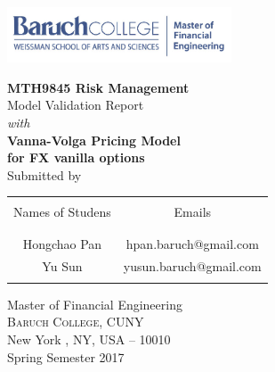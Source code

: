 \begin{titlepage}

\includegraphics[width=0.5\textwidth]{./MFE-Logo}\\[0.2in]

\begin{center}

\textup{\Large {\bf MTH9845 Risk Management} \\ [0.2in] Model Validation Report}\\[0.2in] \textit{with}\\[0.2in]

\Large \textbf {{Vanna-Volga Pricing Model }\\ for FX vanilla options} \\ [1in]



\normalsize Submitted by \\
\begin{table}[h]
\centering
\begin{tabular}{cc}\hline \\
Names of Studens & Emails \\ \\ \hline
\\
Hongchao Pan & hpan.baruch@gmail.com \\[0.1in]
Yu Sun & yusun.baruch@gmail.com \\ \\ \hline 
\end{tabular}
\end{table}

\vspace{.1in}

\vfill

\Large{Master of Financial Engineering}\\
\normalsize
\textsc{Baruch College, CUNY}\\
New York , NY, USA -- 10010 \\
\vspace{0.2cm}
Spring Semester 2017

\end{center}

\end{titlepage}
